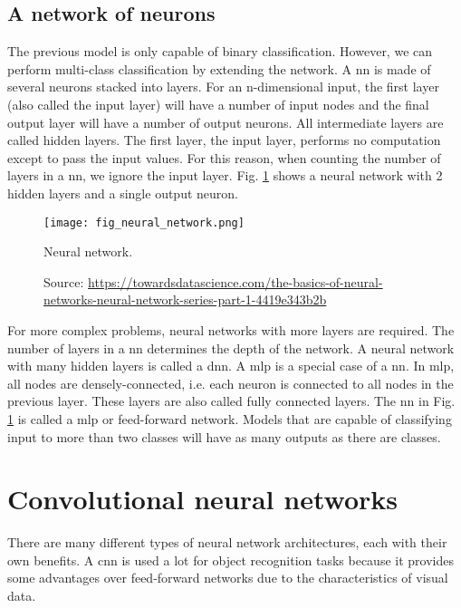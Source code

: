 \subsection{A network of neurons}
The previous model is only capable of binary classification. However, we can perform multi-class classification by extending the network. A \acrfull{nn} is made of several neurons stacked into layers. For an n-dimensional input, the first layer (also called the input layer) will have a number of input nodes and the final output layer will have a number of output neurons. All intermediate layers are called hidden layers. The first layer, the input layer, performs no computation except to pass the input values. For this reason, when counting the number of layers in a \acrshort{nn}, we ignore the input layer. Fig. \ref{fig:neural_network} shows a neural network with 2 hidden layers and a single output neuron. 
\begin{figure}[ht]
    \begin{center}
    \texttt{[image: fig\_neural\_network.png]}
    \caption[Neural network]{Neural network.}
    \caption*{Source: \href{https://towardsdatascience.com/the-basics-of-neural-networks-neural-network-series-part-1-4419e343b2b}{https://towardsdatascience.com/the-basics-of-neural-networks-neural-network-series-part-1-4419e343b2b}}
    \label{fig:neural_network}
    \end{center}
\end{figure}

For more complex problems, neural networks with more layers are required. The number of layers in a \acrshort{nn} determines the depth of the network. A neural network with many hidden layers is called a \acrfull{dnn}. 
A \acrfull{mlp} is a special case of a \acrshort{nn}. In \acrshort{mlp}, all nodes are densely-connected, i.e. each neuron is connected to all nodes in the previous layer. These layers are also called fully connected layers. The \acrshort{nn} in Fig. \ref{fig:neural_network} is called a \acrshort{mlp} or feed-forward network. Models that are capable of classifying input to more than two classes will have as many outputs as there are classes.

\section{Convolutional neural networks}
There are many different types of neural network architectures, each with their own benefits. A \acrfull{cnn} is used a lot for object recognition tasks because it provides some advantages over feed-forward networks due to the characteristics of visual data.

